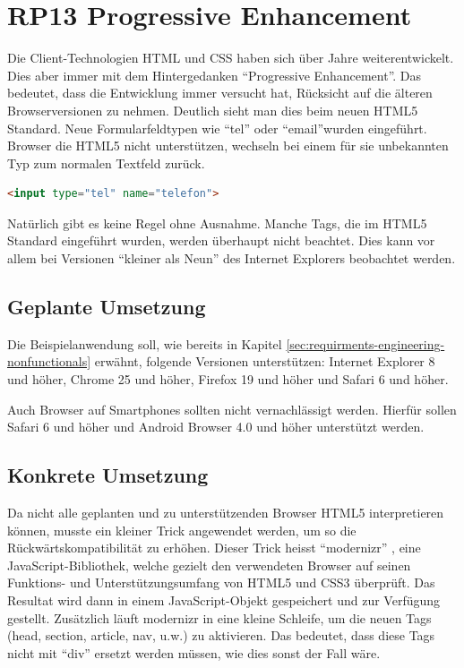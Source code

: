 \section{RP13 Progressive Enhancement}
\label{sec:principle-rp13-progressive-enhancement}

Die Client-Technologien HTML und CSS haben sich über Jahre weiterentwickelt. Dies aber immer mit dem Hintergedanken ``Progressive Enhancement''. Das bedeutet, dass die Entwicklung immer versucht hat, Rücksicht auf die älteren Browserversionen zu nehmen.
Deutlich sieht man dies beim neuen HTML5 Standard. Neue Formularfeldtypen wie ``tel'' oder ``email''wurden eingeführt. Browser die HTML5 nicht unterstützen, wechseln bei einem für sie unbekannten Typ zum normalen Textfeld zurück.

\begin{lstlisting}[language=HTML, caption={Formularfeld mit HTML5, welches eine Telefonnummer erwartet}, label={lst:html5TelInput}]
<input type="tel" name="telefon">
\end{lstlisting}

Natürlich gibt es keine Regel ohne Ausnahme. Manche Tags, die im HTML5 Standard eingeführt wurden, werden überhaupt nicht beachtet. Dies kann vor allem bei Versionen ``kleiner als Neun'' des Internet Explorers beobachtet werden.

\subsection*{Geplante Umsetzung}
Die Beispielanwendung soll, wie bereits in Kapitel \ref{sec:requirments-engineering-nonfunctionals} erwähnt, folgende Versionen unterstützen: Internet Explorer 8 und höher, Chrome 25 und höher, Firefox 19 und höher und Safari 6 und höher.

Auch Browser auf Smartphones sollten nicht vernachlässigt werden. Hierfür sollen Safari 6 und höher und Android Browser 4.0 und höher unterstützt werden.

\subsection*{Konkrete Umsetzung}
Da nicht alle geplanten und zu unterstützenden Browser HTML5 interpretieren können, musste ein kleiner Trick angewendet werden, um so die Rückwärtskompatibilität zu erhöhen. Dieser Trick heisst ``modernizr'' \cite{modernizr}, eine JavaScript-Bibliothek, welche gezielt den verwendeten Browser auf seinen Funktions- und Unterstützungsumfang von HTML5 und CSS3 überprüft. Das Resultat wird dann in einem JavaScript-Objekt gespeichert und zur Verfügung gestellt.  Zusätzlich läuft modernizr in eine kleine Schleife, um die neuen Tags (head, section, article, nav, u.w.) zu aktivieren. Das bedeutet, dass diese Tags nicht mit ``div'' ersetzt werden müssen, wie dies sonst der Fall wäre.

